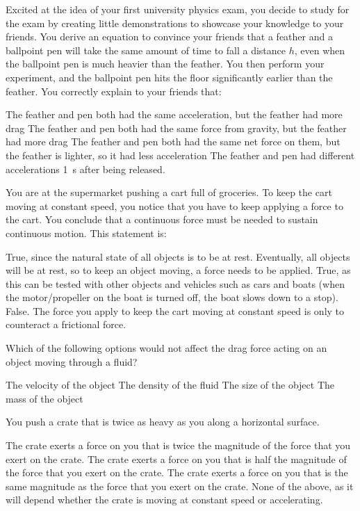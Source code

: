 \question Excited at the idea of your first university physics exam, you decide to study for the exam by creating little demonstrations to showcase your knowledge to your friends. You derive an equation to convince your friends that a feather and a ballpoint pen will take the same amount of time to fall a distance $h$, even when the ballpoint pen is much heavier than the feather. You then perform your experiment, and the ballpoint pen hits the floor significantly earlier than the feather. You correctly explain to your friends that:
\begin{checkboxes} 
\choice The feather and pen both had the same acceleration, but the feather had more drag
\choice The feather and pen both had the same force from gravity, but the feather had more drag
\choice The feather and pen both had the same net force on them, but the feather is lighter, so it had less acceleration
\CorrectChoice The feather and pen had different accelerations \SI{1}{s} after being released. \correct
\end{checkboxes}


\question You are at the supermarket pushing a cart full of groceries. To keep the cart moving at constant speed, you notice that you have to keep applying a force to the cart. You conclude that a continuous force must be needed to sustain continuous motion. This statement is:
\begin{checkboxes} 
\choice True, since the natural state of all objects is to be at rest. Eventually, all objects will be at rest, so to keep an object moving, a force needs to be applied.
\choice True, as this can be tested with other objects and vehicles such as cars and boats (when the motor/propeller on the boat is turned off, the boat slows down to a stop).
\CorrectChoice False. The force you apply to keep the cart moving at constant speed is only to counteract a frictional force. \correct
\end{checkboxes}
\newpage


\question Which of the following options would not affect the drag force acting on an object moving through a fluid?
\begin{checkboxes} 
\choice The velocity of the object
\choice The density of the fluid
\choice The size of the object
\CorrectChoice The mass of the object \correct
\end{checkboxes}

\question You push a crate that is twice as heavy as you along a horizontal surface.
\begin{checkboxes}
\choice The crate exerts a force on you that is twice the magnitude of the force that you exert on the crate.
\choice The crate exerts a force on you that is half the magnitude of the force that you exert on the crate.
\CorrectChoice The crate exerts a force on you that is the same magnitude as the force that you exert on the crate.
\choice None of the above, as it will depend whether the crate is moving at constant speed or accelerating.
\end{checkboxes}

